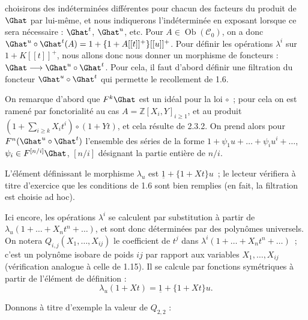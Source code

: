
choisirons des indéterminées différentes pour chacun des facteurs du produit de \(\Ghat\) par lui-même, et nous indiquerons l'indéterminée en exposant lorsque ce sera nécessaire : \(\Ghat^t\), \(\Ghat^u\), etc. Pour \(A\in\operatorname{Ob}(\mathcal C_0)\), on a donc \(\Ghat^u\circ\Ghat^t(A)=1+\{1+A[[t]]^+\}[[u]]^+\). Pour définir les opérations \(\lambda^i\) sur \(1+K[[t]]^+\), nous allons donc nous donner un morphisme de foncteurs : \(\Ghat\longrightarrow\Ghat^u\circ\Ghat^t\).
Pour cela, il faut d'abord définir une filtration du foncteur \(\Ghat^u\circ\Ghat^t\) qui permette le recollement de 1.6.

On remarque d'abord que \(F^k\Ghat\) est un idéal pour la loi \(\circ\)~; pour cela on est ramené par fonctorialité au cas \(A=\mathbb Z[X_i,Y]_{i\geq1}\), et au produit \(\left(1+\sum_{i\geq k}X_i t^i\right)\circ(1+Yt)\), et cela résulte de 2.3.2. On prend alors pour \(F^n(\Ghat^u\circ\Ghat^t)\) l'ensemble des séries de la forme \(1+\psi_1u+\ldots+\psi_i u^i+\ldots\), \(\psi_i\in F^{[n/i]}\Ghat\), \([n/i]\) désignant la partie entière de \(n/i\).

L'élément définissant le morphisme \(\lambda_u\) est \(\underline{1}+\{1+Xt\}u\)~; le lecteur vérifiera à titre d'exercice que les conditions de 1.6 sont bien remplies (en fait, la filtration est choisie ad hoc).

Ici encore, les opérations \(\lambda^i\) se calculent par substitution à partir de \(\lambda_u(1+\ldots+X_nt^n+\ldots)\), et sont donc déterminées par des polynômes universels. On notera \(Q_{i,j}(X_1,\ldots,X_{ij})\) le coefficient de \(t^j\) dans \(\lambda^i(1+\ldots+X_nt^n+\ldots)\)~; c'est un polynôme isobare de poids \(ij\) par rapport aux variables \(X_1,\ldots,X_{ij}\) (vérification analogue à celle de 1.15). Il se calcule par fonctions symétriques à partir de l'élément de définition :
\begin{equation}\tag{2.3.3}
  \lambda_u(1+Xt)=\underline{1}+\{1+Xt\}u.
\end{equation}

Donnons à titre d'exemple la valeur de \(Q_{2,2}\) :
